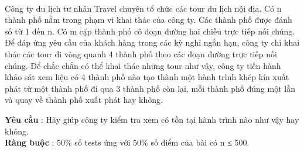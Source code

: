  

Công ty du lịch tư nhân Travel chuyên tổ chức các tour du lịch nội địa. Có n thành phố nằm trong phạm vi khai thác của công ty. Các thành phố được đánh số từ 1 đến n. Có m cặp thành phố có đoạn đường hai chiều trực tiếp nối chúng. Để đáp ứng yêu cầu của khách hàng trong các kỳ nghỉ ngắn hạn, công ty chỉ khai thác các tour đi vòng quanh 4 thành phố theo các đoạn đường trực tiếp nối chúng. Để chắc chắn có thể khai thác những tour như vậy, công ty tiến hành khảo sát xem liệu có 4 thành phố nào tạo thành một hành trình khép kín xuất phát từ một thành phố đi qua 3 thành phố còn lại, mỗi thành phố đúng một lần và quay về thành phố xuất phát hay không.

\textbf{Yêu cầu } : Hãy giúp công ty kiểm tra xem có tồn tại hành trình nào như vậy hay không.
\\\textbf{Ràng buộc } : 50\% số tests ứng với 50\% số điểm của bài có n ≤ 500.

\